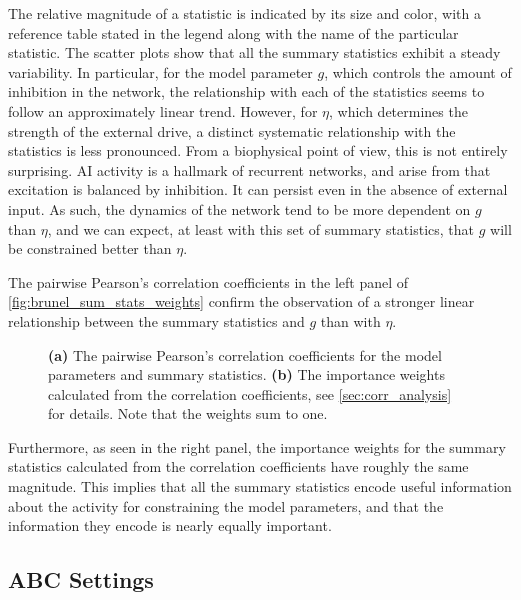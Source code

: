 The relative magnitude of a statistic is indicated by its size and color, with a reference table stated in the legend along with the name of the particular statistic. The scatter plots show that all the summary statistics exhibit a steady variability. In particular, for the model parameter $g$, which controls the amount of inhibition in the network, the relationship with each of the statistics seems to follow an approximately linear trend. However, for $\eta$, which determines the strength of the external drive, a distinct systematic relationship with the statistics is less pronounced. From a biophysical point of view, this is not entirely surprising. AI activity is a hallmark of recurrent networks, and arise from that excitation is balanced by inhibition. It can persist even in the absence of external input. As such, the dynamics of the network tend to be more dependent on $g$ than $\eta$, and we can expect, at least with this set of summary statistics, that $g$ will be constrained better than $\eta$.

The pairwise Pearson's correlation coefficients in the left panel of \autoref{fig:brunel_sum_stats_weights} confirm the observation of a stronger linear relationship between the summary statistics and $g$ than with $\eta$.
\begin{figure}[!htb]
\centering
{}
\qquad
{}
\caption{\textbf{(a)} The pairwise Pearson's correlation coefficients for the model parameters and summary statistics. \textbf{(b)} The importance weights calculated from the correlation coefficients, see \cref{sec:corr_analysis} for details. Note that the weights sum to one.
}
\label{fig:brunel_sum_stats_weights}
\end{figure}
Furthermore, as seen in the right panel, the importance weights for the summary statistics calculated from the correlation coefficients have roughly the same magnitude. This implies that all the summary statistics encode useful information about the activity for constraining the model parameters, and that the information they encode is nearly equally important. 


\subsection{ABC Settings}

